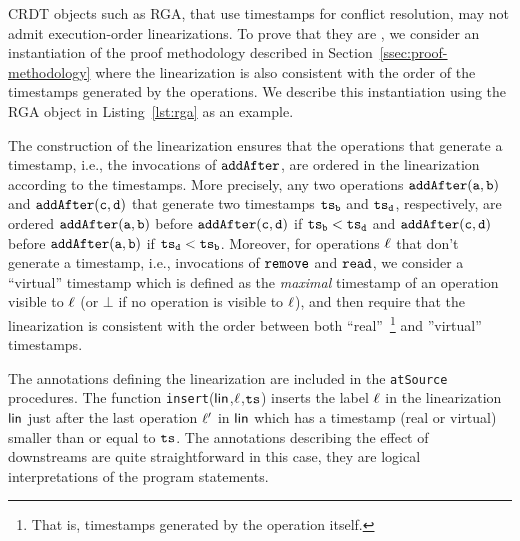 CRDT objects such as RGA, that use timestamps for conflict resolution, may not admit execution-order linearizations. 
To prove that they are \crdtlinearizable{}, we consider an instantiation of the proof methodology described in Section~\ref{ssec:proof-methodology} where the linearization is also consistent with the order of the timestamps generated by the operations. 
We describe this instantiation using the RGA object in Listing~\ref{lst:rga} as an example. 

The construction of the linearization ensures that the operations that generate a timestamp, i.e., the invocations of ${\tt addAfter}$, are ordered in the linearization according to the timestamps. More precisely, any two operations $\alabelshort[{\tt addAfter}]{a,b}$ and $\alabelshort[{\tt addAfter}]{c,d}$ that generate two timestamps $\mathtt{ts}_{\tt b}$ and $\mathtt{ts}_{\tt d}$, respectively, are ordered $\alabelshort[{\tt addAfter}]{a,b}$ before $\alabelshort[{\tt addAfter}]{c,d}$ if $\mathtt{ts}_{\tt b}<\mathtt{ts}_{\tt d}$ and $\alabelshort[{\tt addAfter}]{c,d}$ before $\alabelshort[{\tt addAfter}]{a,b}$ if $\mathtt{ts}_{\tt d}<\mathtt{ts}_{\tt b}$. Moreover, for operations $\ell$ that don't generate a timestamp, i.e., invocations of ${\tt remove}$ and ${\tt read}$, we consider a ``virtual'' timestamp which is defined as the \emph{maximal} timestamp of an operation visible to $\ell$ (or $\bot$ if no operation is visible to $\ell$), and then require that the linearization is consistent with the order between both ``real''~\footnote{That is, timestamps generated by the operation itself.} and ''virtual'' timestamps. 

The annotations defining the linearization are included in the \lstinline|atSource| procedures. The function {\tt insert}($\mathsf{lin}$,$\ell$,$\mathtt{ts}$) inserts the label $\ell$ in the linearization $\mathsf{lin}$ just after the last operation $\ell'$ in $\mathsf{lin}$ which has a timestamp (real or virtual) smaller than or equal to $\mathtt{ts}$. The annotations describing the effect of downstreams are quite straightforward in this case, they are logical interpretations of the program statements. 

